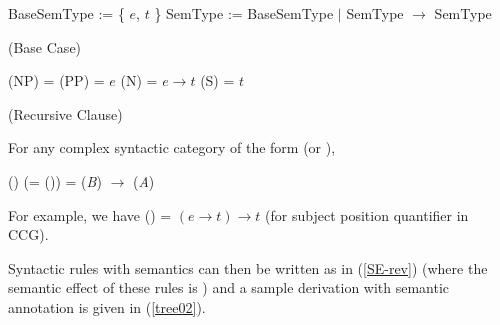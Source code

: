 \documentclass[output=paper]{langsci/langscibook}
\begin{document}
\begin{exe}
 \ex\label{semtyp-def}
  \begin{xlist}
 \ex\label{}
    BaseSemType := \{ $e$, $t$ \}
 \ex\label{}
    SemType := BaseSemType $|$ SemType \ensuremath{ \rightarrow } SemType
  \end{xlist}
 \ex\label{semtyp-base}
  (Base Case)
  \begin{xlist}
 \ex\label{semtyp-np}
    \SemTyp(NP) = \SemTyp(PP) = $e$
 \ex\label{semtyp-np}
    \SemTyp(N) = $e \ensuremath{ \rightarrow } t$
 \ex\label{semtyp-s}
    \SemTyp(S) = $t$
  \end{xlist}
 \ex\label{semtyp-recur}
  (Recursive Clause)
  
  For any complex syntactic category of the form
      (or ), 
  
     \SemTyp()
     (= \SemTyp()) =
     \SemTyp(\textit{B}) \ensuremath{ \rightarrow } \SemTyp(\textit{A})
\end{exe}
For example, we have \SemTyp() =  $(e \ensuremath{ \rightarrow } t) \ensuremath{ \rightarrow } t$
(for subject position quantifier in CCG).

Syntactic rules with semantics can then be written as in (\ref{SE-rev})
(where the semantic effect of these rules is )
and a sample derivation with semantic annotation is given in (\ref{tree02}).
\end{document}
